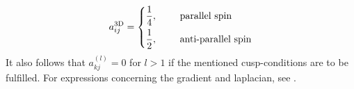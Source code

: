             \begin{equation}
                a^{\text{3D}}_{ij} = \left\{\begin{aligned}
                        \frac{1}{4},&\indent& &\text{parallel spin} \\
                        \frac{1}{2},&\indent& &\text{anti-parallel spin} \\
                    \end{aligned}\right.
            \end{equation}
        It also follows that $a^{(l)}_{kj}=0$ for $l>1$ if the mentioned
        cusp-conditions are to be fulfilled. For expressions concerning the
        gradient and laplacian, see .

